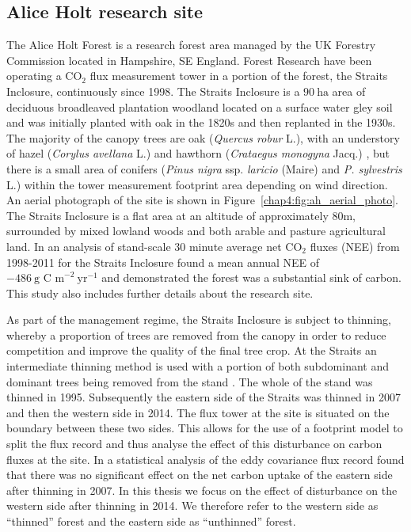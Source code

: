 \subsection{Alice Holt research site} \label{chap4:sec:aliceholt}

The Alice Holt Forest is a research forest area managed by the UK Forestry Commission located in Hampshire, SE England. Forest Research have been operating a $\text{CO}_{2}$ flux measurement tower in a portion of the forest, the Straits Inclosure, continuously since 1998. The Straits Inclosure is a $90~\text{ha}$ area of deciduous broadleaved plantation woodland located on a surface water gley soil and was initially planted with oak in the 1820s \citep{schlich1905working} and then replanted in the 1930s. The majority of the canopy trees are oak (\textit{Quercus robur} L.), with an understory of hazel (\textit{Corylus avellana} L.) and hawthorn (\textit{Crataegus monogyna} Jacq.) \citep{pitman2001leaf}, but there is a small area of conifers (\textit{Pinus nigra} ssp. \textit{laricio} (Maire) and \textit{P. sylvestris} L.) within the tower measurement footprint area depending on wind direction. An aerial photograph of the site is shown in Figure~\ref{chap4:fig:ah_aerial_photo}. The Straits Inclosure is a flat area at an altitude of approximately 80m, surrounded by mixed lowland woods and both arable and pasture agricultural land. In \citet{wilkinson2012inter} an analysis of stand-scale $30$ minute average net $\text{CO}_{2}$ fluxes (NEE) from 1998-2011 for the Straits Inclosure found a mean annual NEE of \(-486~\text{g C m}^{-2}~\text{yr}^{-1}\) and demonstrated the forest was a substantial sink of carbon. This study also includes further details about the research site. 

As part of the management regime, the Straits Inclosure is subject to thinning, whereby a proportion of trees are removed from the canopy in order to reduce competition and improve the quality of the final tree crop. At the Straits an intermediate thinning method is used with a portion of both subdominant and dominant trees being removed from the stand \citep{kerr2011thinning}. The whole of the stand was thinned in 1995. Subsequently the eastern side of the Straits was thinned in 2007 and then the western side in 2014. The flux tower at the site is situated on the boundary between these two sides. This allows for the use of a footprint model to split the flux record and thus analyse the effect of this disturbance on carbon fluxes at the site. In \citet{wilkinson2015effects} a statistical analysis of the eddy covariance flux record found that there was no significant effect on the net carbon uptake of the eastern side after thinning in 2007. In this thesis we focus on the effect of disturbance on the western side after thinning in 2014. We therefore refer to the western side as ``thinned'' forest and the eastern side as ``unthinned'' forest.   


